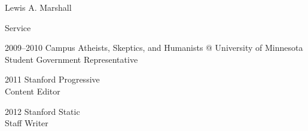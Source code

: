\documentclass{article}
\begin{document}
\begin{cv}{Lewis A. Marshall}
\begin{cvlist}{Service}
    \item[2009--2010] Campus Atheists, Skeptics, and Humanists @ University of Minnesota\\
      Student Government Representative\\

	\item[2011] Stanford Progressive\\
      Content Editor\\

	\item[2012] Stanford Static\\
      Staff Writer\\

  \end{cvlist}
  

\end{cv}
\end{document}
